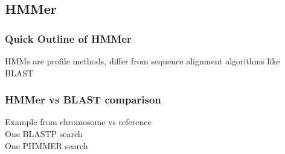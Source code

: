 \documentclass[table]{beamer}
\begin{document}
\subsection{HMMer}

    \begin{frame}
      \frametitle{Quick Outline of HMMer}   
      HMMs are profile methods, differ from sequence alignment algorithms like BLAST
    \end{frame}

    \begin{frame}
      \frametitle{HMMer vs BLAST comparison}   
      Example from chromosome vs reference \\
      One BLASTP search \\
      One PHMMER search
    \end{frame}
\end{document}
